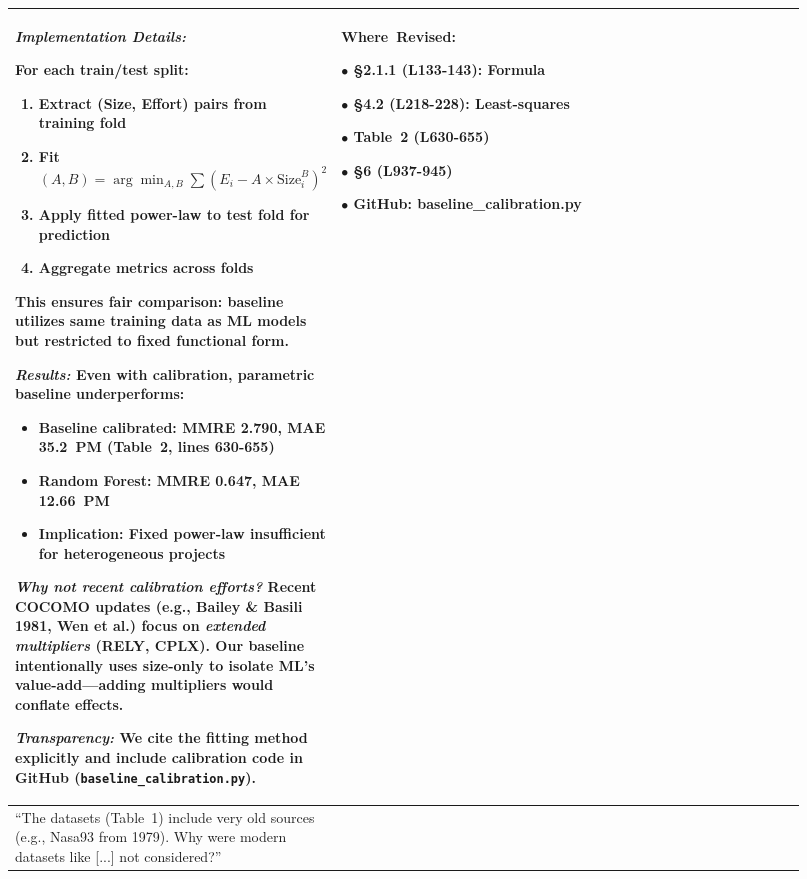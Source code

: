 \documentclass[11pt,a4paper]{article}
\begin{document}
\begin{longtable}{>{\raggedright\arraybackslash}p{0.26\linewidth}|>{\raggedright\arraybackslash}p{0.44\linewidth}|>{\raggedright\arraybackslash}p{0.22\linewidth}}
\textit{Implementation Details:}

For each train/test split:
\begin{enumerate}
    \item Extract (Size, Effort) pairs from training fold
    \item Fit $(A, B) = \arg\min_{A,B} \sum (E_i - A \times \text{Size}_i^B)^2$
    \item Apply fitted power-law to test fold for prediction
    \item Aggregate metrics across folds
\end{enumerate}

This ensures \textbf{fair comparison}: baseline utilizes same training data as ML models but restricted to fixed functional form.

\textit{Results:} Even with calibration, parametric baseline underperforms:
\begin{itemize}
    \item \textbf{Baseline calibrated}: MMRE 2.790, MAE 35.2~PM (Table~2, lines 630-655)
    \item \textbf{Random Forest}: MMRE 0.647, MAE 12.66~PM
    \item \textbf{Implication}: Fixed power-law insufficient for heterogeneous projects
\end{itemize}

\textit{Why not recent calibration efforts?} Recent COCOMO updates (e.g., Bailey \& Basili 1981, Wen et al.) focus on \textit{extended multipliers} (RELY, CPLX). Our baseline intentionally uses \textbf{size-only} to isolate ML's value-add---adding multipliers would conflate effects.

\textit{Transparency:} We cite the fitting method explicitly and include calibration code in GitHub (\texttt{baseline\_calibration.py}). &

\textbf{Where~Revised:}

$\bullet$ §2.1.1 (L133-143): Formula

$\bullet$ §4.2 (L218-228): Least-squares

$\bullet$ Table~2 (L630-655)

$\bullet$ §6 (L937-945)

$\bullet$ GitHub: baseline\_calibration.py \\

\midrule

``The datasets (Table~1) include very old sources (e.g., Nasa93 from 1979). Why were modern datasets like [...] not considered?'' &


\end{longtable}
\end{document}
